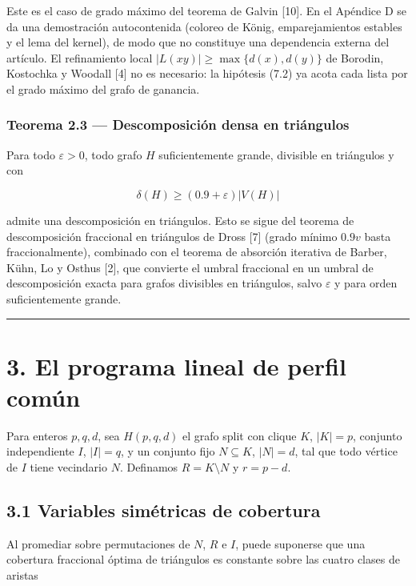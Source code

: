 \documentclass[
  11pt,
]{article}
\begin{document}
Este es el caso de grado máximo del teorema de Galvin {[}10{]}. En el
Apéndice D se da una demostración autocontenida (coloreo de König,
emparejamientos estables y el lema del kernel), de modo que no
constituye una dependencia externa del artículo. El refinamiento local
\(|L(xy)|\ge\max\{d(x),d(y)\}\) de Borodin, Kostochka y Woodall {[}4{]}
no es necesario: la hipótesis (7.2) ya acota cada lista por el grado
máximo del grafo de ganancia.

\subsubsection{Teorema 2.3 --- Descomposición densa en
triángulos}\label{teorema-2.3-descomposiciuxf3n-densa-en-triuxe1ngulos}

Para todo \(\varepsilon>0\), todo grafo \(H\) suficientemente grande,
divisible en triángulos y con

\[
\delta(H)\ge(0.9+\varepsilon)|V(H)|
\]

admite una descomposición en triángulos. Esto se sigue del teorema de
descomposición fraccional en triángulos de Dross {[}7{]} (grado mínimo
\(0.9v\) basta fraccionalmente), combinado con el teorema de absorción
iterativa de Barber, Kühn, Lo y Osthus {[}2{]}, que convierte el umbral
fraccional en un umbral de descomposición exacta para grafos divisibles
en triángulos, salvo \(\varepsilon\) y para orden suficientemente
grande.

\begin{center}\rule{0.5\linewidth}{0.5pt}\end{center}

\section{3. El programa lineal de perfil
común}\label{el-programa-lineal-de-perfil-comuxfan}

Para enteros \(p,q,d\), sea \(H(p,q,d)\) el grafo split con clique
\(K\), \(|K|=p\), conjunto independiente \(I\), \(|I|=q\), y un conjunto
fijo \(N\subseteq K\), \(|N|=d\), tal que todo vértice de \(I\) tiene
vecindario \(N\). Definamos \(R=K\setminus N\) y \(r=p-d\).

\subsection{3.1 Variables simétricas de
cobertura}\label{variables-simuxe9tricas-de-cobertura}

Al promediar sobre permutaciones de \(N\), \(R\) e \(I\), puede
suponerse que una cobertura fraccional óptima de triángulos es constante
sobre las cuatro clases de aristas
\end{document}
